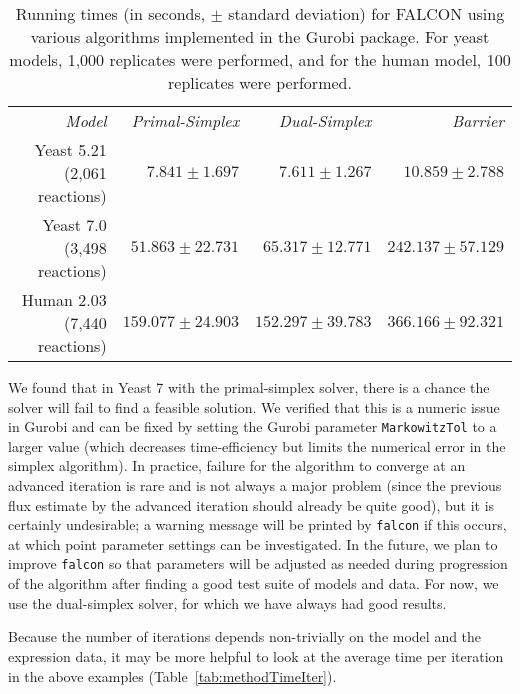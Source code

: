 \begin{table}
\begin{center}
\begin{tabular}{rrrr}
\emph{Model}                 & \emph{Primal-Simplex} & \emph{Dual-Simplex} & \emph{Barrier} \\
Yeast 5.21 (2,061 reactions) & $ 7.841 \pm 1.697    $ & $ 7.611 \pm 1.267    $ & $ 10.859 \pm 2.788   $\\ 
Yeast 7.0 (3,498 reactions)  & $ 51.863 \pm 22.731  $ & $ 65.317 \pm 12.771  $ & $ 242.137 \pm 57.129 $\\
Human 2.03 (7,440 reactions) & $ 159.077 \pm 24.903 $ & $ 152.297 \pm 39.783 $ & $ 366.166 \pm 92.321 $\\
\end{tabular}
\end{center}
\caption{Running times (in seconds, $\pm$ standard deviation) for
  FALCON using various algorithms implemented in the Gurobi package.
  For yeast models, 1,000 replicates were performed, and for the human
  model, 100 replicates were performed.}
\label{tab:methodTime}
\end{table}

We found that in Yeast 7 with the primal-simplex solver, there is a
chance the solver will fail to find a feasible solution.
We verified that this is a numeric issue
in Gurobi and can be fixed by setting the Gurobi parameter
\texttt{MarkowitzTol} to a larger value (which decreases
time-efficiency but limits the numerical error in the
simplex algorithm). In practice, failure for the algorithm to converge
at an advanced iteration is rare and is not always a major problem (since the previous
flux estimate by the advanced iteration should already be quite good), but it
is certainly undesirable; a warning message will be printed by
\texttt{falcon} if this occurs, at which point parameter settings can
be investigated. In the future, we plan to improve \texttt{falcon} so
that parameters will be adjusted as needed during progression of the
algorithm after finding a good test suite of models and data. For now,
we use the dual-simplex solver, for which we have always had good
results.

Because the number of iterations depends non-trivially on the model
and the expression data, it may be more helpful to look at the 
average time per iteration in the above examples 
(\suppOrApp Table~\ref{tab:methodTimeIter}).

